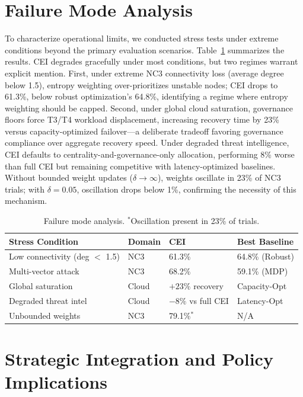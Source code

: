 \documentclass[runningheads]{llncs}
\begin{document}
\section{Failure Mode Analysis}
\label{sec:failuremode}

To characterize operational limits, we conducted stress tests under extreme conditions beyond the primary evaluation scenarios. Table~\ref{tab:failure} summarizes the results. CEI degrades gracefully under most conditions, but two regimes warrant explicit mention. First, under extreme NC3 connectivity loss (average degree below 1.5), entropy weighting over-prioritizes unstable nodes; CEI drops to 61.3\%, below robust optimization's 64.8\%, identifying a regime where entropy weighting should be capped. Second, under global cloud saturation, governance floors force T3/T4 workload displacement, increasing recovery time by 23\% versus capacity-optimized failover---a deliberate tradeoff favoring governance compliance over aggregate recovery speed. Under degraded threat intelligence, CEI defaults to centrality-and-governance-only allocation, performing 8\% worse than full CEI but remaining competitive with latency-optimized baselines. Without bounded weight updates ($\delta \to \infty$), weights oscillate in 23\% of NC3 trials; with $\delta = 0.05$, oscillation drops below 1\%, confirming the necessity of this mechanism.

\begin{table}[ht]
\caption{Failure mode analysis. $^*$Oscillation present in 23\% of trials.}
\label{tab:failure}
\centering
\small
\begin{tabular}{p{4.5cm}lll}
\toprule
Stress Condition & Domain & CEI & Best Baseline \\
\midrule
Low connectivity (deg $<$ 1.5) & NC3   & 61.3\%             & 64.8\% (Robust) \\
Multi-vector attack            & NC3   & 68.2\%             & 59.1\% (MDP) \\
Global saturation              & Cloud & $+23\%$ recovery   & Capacity-Opt \\
Degraded threat intel          & Cloud & $-8\%$ vs full CEI & Latency-Opt \\
Unbounded weights              & NC3   & 79.1\%$^*$         & N/A \\
\bottomrule
\end{tabular}
\end{table}

\section{Strategic Integration and Policy Implications}
\label{sec:strategic}
\end{document}
